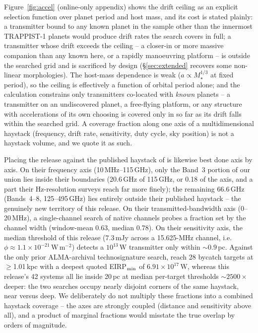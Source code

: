 \documentclass{openjournal}
\begin{document}
Figure~\ref{fig:accel} (online-only appendix) shows the drift ceiling
as an explicit selection function over planet period and host mass, and its cost is
stated plainly: a transmitter bound to any known planet in the sample
other than the innermost TRAPPIST-1 planets would produce drift rates
the search covers in full; a transmitter whose drift exceeds the
ceiling -- a closer-in or more massive companion than any known here,
or a rapidly manoeuvring platform -- is outside the searched grid and
is sacrificed by design (\S\ref{sec:extended} recovers some non-linear
morphologies). The host-mass dependence is weak ($a \propto
M_\star^{1/3}$ at fixed period), so the ceiling is effectively a
function of orbital period alone; and the calculation constrains only
transmitters co-located with \emph{known} planets -- a transmitter on
an undiscovered planet, a free-flying platform, or any structure with
accelerations of its own choosing is covered only in so far as its
drift falls within the searched grid. A coverage fraction along one
axis of a multidimensional haystack (frequency, drift rate,
sensitivity, duty cycle, sky position) is not a haystack volume, and
we quote it as such.

Placing the release against the published haystack of
\citet{Wright2018} is likewise best done axis by axis. On their
frequency axis (10\,MHz--115\,GHz), only the Band~3 portion of our
union lies inside their boundaries (20.6\,GHz of 115\,GHz, or 0.18 of
the axis, and a part their Hz-resolution surveys reach far more
finely); the remaining 66.6\,GHz (Bands~4--8, 125--495\,GHz) lies
entirely outside their published haystack -- the genuinely new
territory of this release. On their transmitted-bandwidth axis
(0--20\,MHz), a single-channel search of native channels probes a
fraction set by the channel width (window-mean 0.63, median 0.78). On
their sensitivity axis, the median threshold of this release
($7.3$\,mJy across a 15.625-MHz channel, i.e.\
$\phi\approx1.1\times10^{-21}$\,W\,m$^{-2}$) detects a
$10^{13}$\,W transmitter only within ${\sim}0.9$\,pc. Against the
only prior ALMA-archival technosignature search,
\citet{Mason2024} reach 28 bycatch targets at $\geq$1.01\,kpc with a
deepest quoted EIRP$_{\rm min}$ of $6.91\times10^{17}$\,W, whereas
this release's 42 systems all lie inside 20\,pc at median per-target
thresholds ${\sim}2500\times$ deeper: the two searches occupy nearly
disjoint corners of the same haystack, near versus deep. We
deliberately do not multiply these fractions into a combined haystack
coverage -- the axes are strongly coupled (distance and sensitivity
above all), and a product of marginal fractions would misstate the
true overlap by orders of magnitude.
\end{document}
